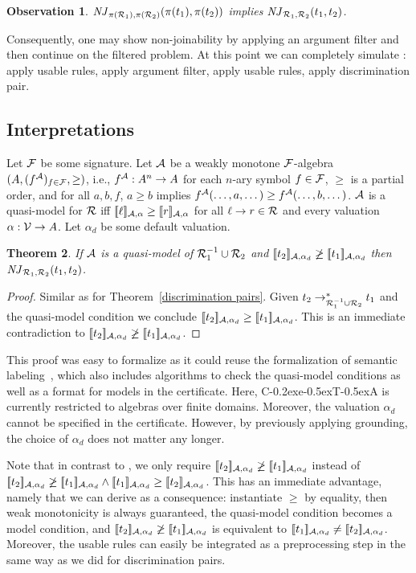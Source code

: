 \documentclass[a4paper]{easychair}
\newtheorem{theorem}{Theorem}
\newtheorem{observation}[theorem]{Observation}
\newcommand\ceta{\textsf{C\kern-0.2exe\kern-0.5exT\kern-0.5exA}\xspace}
\newcommand\sem[1]{[\![#1]\!]_{\AAA,\alpha}}
\newcommand\semz[1]{[\![#1]\!]_{\AAA,\alpha_d}}
\newcommand\VV{{\cal V}}
\newcommand\AAA{{\cal A}}
\newcommand\FF{{\cal F}}
\newcommand\RR{{\cal R}}
\newcommand\njin[3]{\mathit{NJ}_{#1}(#2,#3)}
\newcommand\nj[4]{\njin{#1,#2}{#3}{#4}}
\newcommand\rTH[1]{Theorem~\ref{#1}}
\begin{document}
\begin{observation}
\label{argument filter}
$\nj{\pi(\RR_1)}{\pi(\RR_2)}{\pi(t_1)}{\pi(t_2)}$ 
implies $\nj{\RR_1}{\RR_2}{t_1}{t_2}$.
\end{observation}

Consequently, one may show non-joinability by applying an argument filter
and then continue on the filtered problem.
At this point we can completely simulate \cite[Theorem 14]{Aoto}:
apply usable rules, apply argument filter, apply usable rules, apply discrimination pair.

\subsection{Interpretations}
Let $\FF$ be some signature. Let $\AAA$ be a weakly monotone $\FF$-algebra $(A,(f^\AAA)_{f \in \FF},\geq)$, i.e.,
$f^\AAA : A^n \to A$ for each $n$-ary symbol $f \in \FF$, $\geq$ is a partial order, \pagebreak
and for all $a,b,f$, $a \geq b$ implies $f^\AAA(\dots,a,\dots) \geq f^\AAA(\dots,b,\dots)$.
$\AAA$ is a quasi-model for $\RR$ iff $\sem{\ell} \geq \sem{r}$
for all $\ell \to r \in \RR$ and every valuation $\alpha : \VV \to A$.
Let $\alpha_d$ be some default valuation.

\begin{theorem}
\label{quasi}
If $\AAA$ is a quasi-model of $\RR_1^{-1} \cup \RR_2$ and $\semz{t_2} \not\geq \semz{t_1}$ then
$\nj{\RR_1}{\RR_2}{t_1}{t_2}$.
\end{theorem}

\begin{proof}
Similar as for \rTH{discrimination pairs}. Given $t_2 \to_{\RR_1^{-1} \cup \RR_2}^* t_1$
and the quasi-model condition we conclude $\semz{t_2} \geq \semz{t_1}$. 
This is an immediate contradiction to 
$\semz{t_2} \not\geq \semz{t_1}$.
\end{proof}

This proof was easy to formalize as it could reuse the formalization of semantic labeling~\cite{CSRT-RTA11},
which also includes algorithms to check the quasi-model conditions as well as 
a format for models in the certificate.
Here, \ceta is currently restricted to algebras over finite domains.
Moreover, the valuation $\alpha_d$ cannot be specified in the certificate. However,
by previously applying grounding, the choice of $\alpha_d$ does not matter any longer.

Note that in contrast to \cite[Theorem 10]{Aoto}, we only require $\semz{t_2} \not\geq \semz{t_1}$
instead of $\semz{t_2} \not\geq \semz{t_1} \wedge \semz{t_1} \geq \semz{t_2}$.
This has an immediate advantage, namely that we can derive \cite[Corollary 6]{Aoto} as a consequence:
instantiate $\geq$ by equality, then weak monotonicity is always guaranteed, the quasi-model condition
becomes a model condition, and $\semz{t_2} \not\geq \semz{t_1}$ is equivalent to
$\semz{t_1} \neq \semz{t_2}$. Moreover, the usable rules can easily be integrated as a preprocessing
step in the same way as we did for discrimination pairs.
\end{document}

